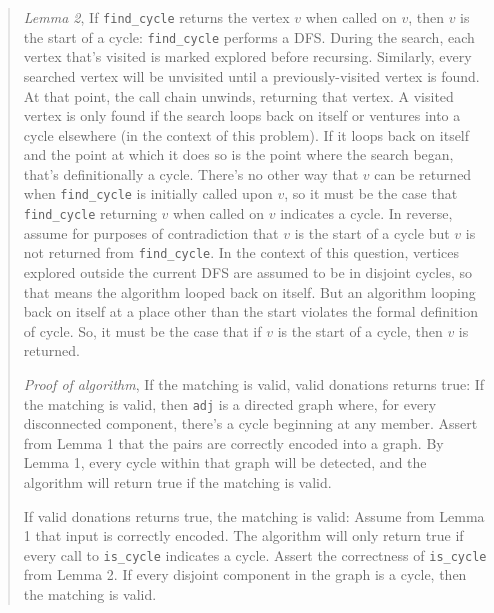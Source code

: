 \documentclass[11pt]{article}
\begin{document}
\begin{enumerate}
\begin{enumerate}
\begin{quote}
  \medskip 
  \textit{Lemma 2}, If \texttt{find\_cycle} returns the vertex $v$ when called on $v$, then $v$ is the start of a cycle: \texttt{find\_cycle} performs a DFS.  During the search, each vertex that's visited is marked explored before recursing. Similarly, every searched vertex will be unvisited until a previously-visited vertex is found. At that point, the call chain unwinds, returning that vertex. A visited vertex is only found if the search loops back on itself or ventures into a cycle elsewhere (in the context of this problem). If it loops back on itself and the point at which it does so is the point where the search began, that's definitionally a cycle. There's no other way that $v$ can be returned when \texttt{find\_cycle} is initially called upon $v$, so it must be the case that \texttt{find\_cycle} returning $v$ when called on $v$ indicates a cycle. In reverse, assume for purposes of contradiction that $v$ is the start of a cycle but $v$ is not returned from \texttt{find\_cycle}. In the context of this question, vertices explored outside the current DFS are assumed to be in disjoint cycles, so that means the algorithm looped back on itself. But an algorithm looping back on itself at a place other than the start violates the formal definition of cycle. So, it must be the case that if $v$ is the start of a cycle, then $v$ is returned. 

  \medskip
  \textit{Proof of algorithm}, If the matching is valid, valid donations returns true: If the matching is valid, then \texttt{adj} is a directed graph where, for every disconnected component, there's a cycle  beginning at any member. Assert from Lemma 1 that the pairs are correctly encoded into a graph. By Lemma 1, every cycle within that graph will be detected, and the algorithm will return true if the matching is valid.

  \medskip
  If valid donations returns true, the matching is valid: Assume from Lemma 1 that input is correctly encoded. The algorithm will only return true if every call to \texttt{is\_cycle} indicates a cycle. Assert the correctness of \texttt{is\_cycle} from Lemma 2. If every disjoint component in the graph is a cycle, then the matching is valid.


\end{quote}
\end{enumerate}
\end{enumerate}
\end{document}
